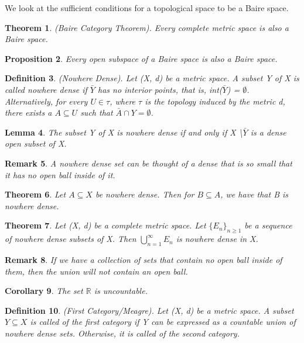 \documentclass[twoside]{article}
\newcounter{lecnum}
\newtheorem{theorem}{Theorem}[lecnum]
\newtheorem{lemma}[theorem]{Lemma}
\newtheorem{proposition}[theorem]{Proposition}
\newtheorem{corollary}[theorem]{Corollary}
\newtheorem{definition}[theorem]{Definition}
\newtheorem{remark}[theorem]{Remark}
\begin{document}
We look at the sufficient conditions for a topological space to be a Baire space.


\begin{theorem}(Baire Category Theorem). Every complete metric space is also a Baire space.
\end{theorem}

\begin{proposition}Every open subspace of a Baire space is also a Baire space.
\end{proposition}

\begin{definition}(Nowhere Dense). Let (X, d) be a metric space. A subset Y of X is called nowhere dense if $\bar{Y}$ has no interior points, that is, int($\bar{Y}$) = $\emptyset$. Alternatively, for every $U \in \tau$, where $\tau$ is the topology induced by the metric d, there exists a $A \subseteq U$ such that $\bar{A} \cap Y = \emptyset$.
\end{definition}

\begin{lemma}The subset Y of X is nowhere dense if and only if X \textbackslash $\bar{Y}$ is a dense open subset of X.
\end{lemma}

\begin{remark}A nowhere dense set can be thought of a dense that is so small that it has no open ball inside of it.
\end{remark}

\begin{theorem}Let $A \subseteq X$ be nowhere dense. Then for $B \subseteq A$, we have that B is nowhere dense.
\end{theorem}

\begin{theorem} Let (X, d) be a complete metric space. Let $\{E_n\}_{n \geq 1}$ be a sequence of nowhere dense subsets of X. Then $\bigcup_{n=1}^{\infty}E_n$ is nowhere dense in X.
\end{theorem}

\begin{remark}If we have a collection of sets that contain no open ball inside of them, then the union will not contain an open ball.
\end{remark}


\begin{corollary}The set $\mathbb{R}$ is uncountable.
\end{corollary}

\begin{definition}(First Category/Meagre). Let (X, d) be a metric space. A subset $Y \subseteq X$ is called of the first category if Y can be expressed as a countable union of nowhere dense sets. Otherwise, it is called of the second category.
\end{definition}
\end{document}
